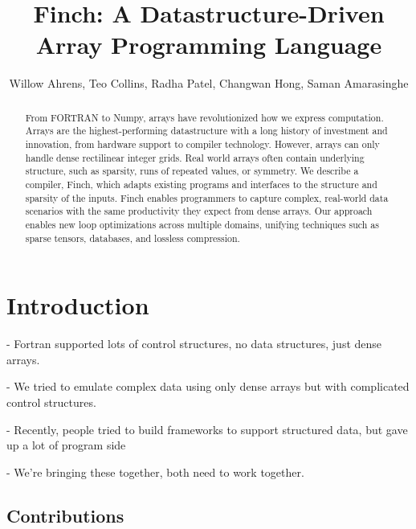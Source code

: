 \documentclass{article}
\title{Finch: A Datastructure-Driven Array Programming Language}
\author{Willow Ahrens, Teo Collins, Radha Patel, Changwan Hong, Saman Amarasinghe}
\begin{document}
\maketitle

\begin{abstract}
From FORTRAN to Numpy, arrays have revolutionized how we express computation.
Arrays are the highest-performing datastructure with a long history of investment and innovation, from hardware support to compiler technology. 
However, arrays can only handle dense rectilinear integer grids. Real world arrays often contain underlying structure, such as sparsity, runs of repeated values, or symmetry. We describe a compiler, Finch, which adapts existing programs and interfaces to the structure and sparsity of the inputs. Finch enables programmers to capture complex, real-world data scenarios with the same productivity they expect from dense arrays. Our approach enables new loop optimizations across multiple domains, unifying techniques such as sparse tensors, databases, and lossless compression. 
\end{abstract}

\section{Introduction}

- Fortran supported lots of control structures, no data structures, just dense arrays.

- We tried to emulate complex data using only dense arrays but with complicated control structures.

- Recently, people tried to build frameworks to support structured data, but gave up a lot of program side

- We’re bringing these together, both need to work together.

\subsection{Contributions}
\end{document}
